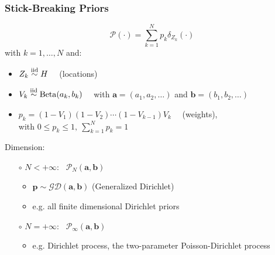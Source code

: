 	

\begin{frame}
	\frametitle{Stick-Breaking Priors}
	$$\mathscr{P}(\cdot)= \sum\limits_{k=1}^N
	\mathit{p_{k}}\delta_{Z_{k}}(\cdot)$$
	with $k=1,\dots,N$ and:
	\begin{itemize}
		\item $Z_k \stackrel{\text{iid}}{\sim} H \quad$ (locations)
		\item $V_k  \stackrel{\text{iid}}{\sim} \operatorname{Beta}(a_{k},b_{k}) \quad$ with $\mathbf{a}=(a_{1},a_{2},\dots)$ and $\mathbf{b}=(b_{1},b_{2},\dots)$
		\item $p_k = (1-V_{1}) (1-V_{2}) \cdots (1-V_{k-1}) V_k \quad$ (weights), \\[8pt] %
		with $0 \leq p_k \leq 1, \ \sum_{k=1}^N p_k = 1$
	\end{itemize}
	Dimension:
   	\begin{itemize}
   	    \item[$\circ$] $N<+\infty$: \ $\mathscr{P}_{N}(\mathbf{a},\mathbf{b})$
   	    \begin{itemize}
   	        \item $\mathbf{p} \sim \mathscr{GD}(\mathbf{a},\mathbf{b})$ (Generalized Dirichlet)
   	        \item e.g. all finite dimensional Dirichlet priors
   	    \end{itemize}
   	    \item[$\circ$] $N=+\infty$: \ $\mathscr{P}_{\infty}(\mathbf{a},\mathbf{b})$
   	    \begin{itemize}
   	        \item e.g. Dirichlet process, the two-parameter Poisson-Dirichlet process
   	    \end{itemize}
   	\end{itemize}
\end{frame}


